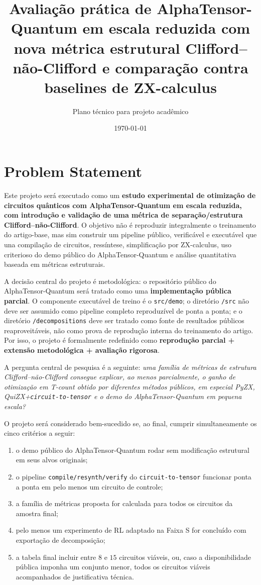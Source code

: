 \documentclass[a4paper,11pt]{article}
\title{Avaliação prática de AlphaTensor-Quantum em escala reduzida com nova métrica estrutural Clifford--não-Clifford e comparação contra baselines de ZX-calculus}
\author{Plano técnico para projeto acadêmico}
\date{\today}
\begin{document}
\maketitle
\tableofcontents
\bigskip

\section{Problem Statement}

Este projeto será executado como um \textbf{estudo experimental de otimização de circuitos quânticos com AlphaTensor-Quantum em escala reduzida, com introdução e validação de uma métrica de separação/estrutura Clifford--não-Clifford}. O objetivo não é reproduzir integralmente o treinamento do artigo-base, mas sim construir um pipeline público, verificável e executável que una compilação de circuitos, ressíntese, simplificação por ZX-calculus, uso criterioso do demo público do AlphaTensor-Quantum e análise quantitativa baseada em métricas estruturais.

A decisão central do projeto é metodológica: o repositório público do AlphaTensor-Quantum será tratado como uma \textbf{implementação pública parcial}. O componente executável de treino é o \texttt{src/demo}; o diretório \texttt{/src} não deve ser assumido como pipeline completo reproduzível de ponta a ponta; e o diretório \texttt{/decompositions} deve ser tratado como fonte de resultados públicos reaproveitáveis, não como prova de reprodução interna do treinamento do artigo. Por isso, o projeto é formalmente redefinido como \textbf{reprodução parcial + extensão metodológica + avaliação rigorosa}.

A pergunta central de pesquisa é a seguinte: \textit{uma família de métricas de estrutura Clifford--não-Clifford consegue explicar, ao menos parcialmente, o ganho de otimização em T-count obtido por diferentes métodos públicos, em especial PyZX, QuiZX+\texttt{circuit-to-tensor} e o demo do AlphaTensor-Quantum em pequena escala?}

O projeto será considerado bem-sucedido se, ao final, cumprir simultaneamente os cinco critérios a seguir:
\begin{enumerate}
  \item o demo público do AlphaTensor-Quantum rodar sem modificação estrutural em seus alvos originais;
  \item o pipeline \texttt{compile/resynth/verify} do \texttt{circuit-to-tensor} funcionar ponta a ponta em pelo menos um circuito de controle;
  \item a família de métricas proposta for calculada para todos os circuitos da amostra final;
  \item pelo menos um experimento de RL adaptado na Faixa S for concluído com exportação de decomposição;
  \item a tabela final incluir entre $8$ e $15$ circuitos viáveis, ou, caso a disponibilidade pública imponha um conjunto menor, todos os circuitos viáveis acompanhados de justificativa técnica.
\end{enumerate}
\end{document}
